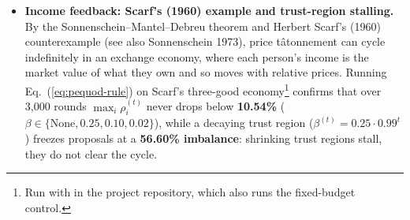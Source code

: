 \documentclass[10pt,twoside,openany]{book}
\theoremstyle{dpepstyle}
\begin{document}
\begin{itemize}[leftmargin=1.6em,itemsep=2pt]
  \item \textbf{Income feedback: Scarf's (1960) example and trust-region stalling.} By the Sonnenschein--Mantel--Debreu theorem and Herbert Scarf's (1960) counterexample (see also Sonnenschein 1973), price t\^atonnement can cycle indefinitely in an exchange economy, where each person's income is the market value of what they own and so moves with relative prices. Running Eq.~(\ref{eq:pequod-rule}) on Scarf's three-good economy\footnote{Run with  in the project repository, which also runs the fixed-budget control.} confirms that over 3,000 rounds $\max_i \rho_i^{(t)}$ never drops below \textbf{10.54\%} ($\beta \in \{\text{None}, 0.25, 0.10, 0.02\}$), while a decaying trust region ($\beta^{(t)} = 0.25 \cdot 0.99^t$) freezes proposals at a \textbf{56.60\% imbalance}: shrinking trust regions stall, they do not clear the cycle.


\end{itemize}
\end{document}
